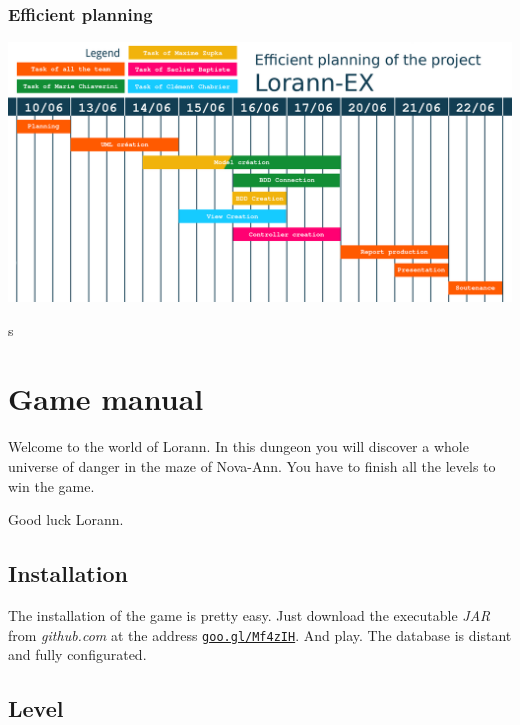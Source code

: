 \documentclass{report}
\begin{document}
\begin{landscape}
\subsection{Efficient planning}
\vspace*{\fill}

\begin{center}
\includegraphics{resources/Planning-effectif.png}
\end{center}

\vspace*{\fill}s
\end{landscape}

\chapter{Game manual}

Welcome to the world of Lorann. In this dungeon you will discover a whole universe of danger in the maze of Nova-Ann. You have to finish all the levels to win the game.

Good luck Lorann.

\section{Installation}

The installation of the game is pretty easy. Just download the executable \emph{JAR} from \emph{github.com} at the address \texttt{\href{https://github.com/EpicKiwi/Lorann-Ex/releases/download/0.0.2/Lorann-Ex-0.0.2-SNAPSHOT.jar}{goo.gl/Mf4zIH}}. And play. The database is distant and fully configurated.

\section{Level}
\end{document}
